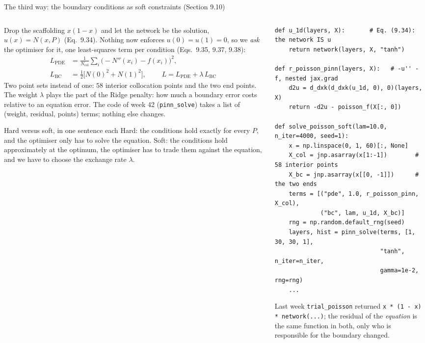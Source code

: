 \documentclass[10pt,aspectratio=169]{beamer}
\begin{document}
\begin{frame}[fragile]{The third way: the boundary conditions as soft constraints (Section 9.10)}
\begin{columns}[T]
\begin{column}{0.47\textwidth}
\scriptsize
Drop the scaffolding $x(1-x)$ and let the network be the solution,
$u(x)=N(x,P)$ (Eq.~9.34).  Nothing now enforces $u(0)=u(1)=0$, so we
\emph{ask} the optimiser for it, one least-squares term per condition
(Eqs.~9.35, 9.37, 9.38):
\begin{align*}
  L_{\mathrm{PDE}}&=\frac{1}{N_{\mathrm{col}}}\sum_{i}\bigl(-N''(x_i)-f(x_i)\bigr)^{2},\\
  L_{\mathrm{BC}}&=\tfrac{1}{2}\bigl[N(0)^{2}+N(1)^{2}\bigr],\qquad
  \boxed{\;L=L_{\mathrm{PDE}}+\lambda\,L_{\mathrm{BC}}\;}
\end{align*}
Two point sets instead of one: $58$ interior collocation points and the
two end points.  The weight $\lambda$ plays the part of the Ridge penalty:
how much a boundary error costs relative to an equation error.  The code
of week 42 (\texttt{pinn\_solve}) takes a list of (weight, residual,
points) terms; nothing else changes.
\begin{block}{Hard versus soft, in one sentence each}
\scriptsize
Hard: the conditions hold exactly for every $P$, and the optimiser only
has to solve the equation.  Soft: the conditions hold approximately at the
optimum, the optimiser has to trade them against the equation, and we have
to choose the exchange rate $\lambda$.
\end{block}
\end{column}
\begin{column}{0.51\textwidth}
\begin{lstlisting}
def u_1d(layers, X):       # Eq. (9.34): the network IS u
    return network(layers, X, "tanh")

def r_poisson_pinn(layers, X):   # -u'' - f, nested jax.grad
    d2u = d_dxk(d_dxk(u_1d, 0), 0)(layers, X)
    return -d2u - poisson_f(X[:, 0])

def solve_poisson_soft(lam=10.0, n_iter=4000, seed=1):
    x = np.linspace(0, 1, 60)[:, None]
    X_col = jnp.asarray(x[1:-1])        # 58 interior points
    X_bc = jnp.asarray(x[[0, -1]])      # the two ends
    terms = [("pde", 1.0, r_poisson_pinn, X_col),
             ("bc", lam, u_1d, X_bc)]
    rng = np.random.default_rng(seed)
    layers, hist = pinn_solve(terms, [1, 30, 30, 1],
                              "tanh", n_iter=n_iter,
                              gamma=1e-2, rng=rng)
    ...
\end{lstlisting}
\scriptsize
Last week \texttt{trial\_poisson} returned \texttt{x * (1 - x) * network(...)};
the residual of the \emph{equation} is the same function in both, only who
is responsible for the boundary changed.
\end{column}
\end{columns}
\end{frame}
\end{document}

